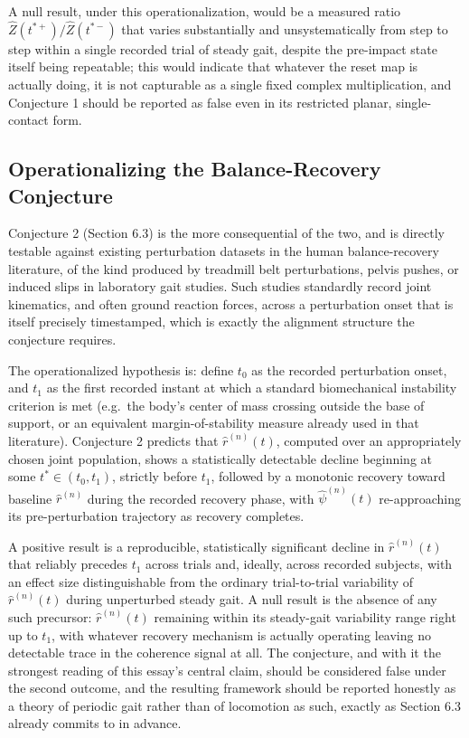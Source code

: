 \documentclass[12pt]{article}
\begin{document}
A null result, under this operationalization, would be a measured ratio $\hat Z(t^{*+})/\hat Z(t^{*-})$ that varies substantially and unsystematically from step to step within a single recorded trial of steady gait, despite the pre-impact state itself being repeatable; this would indicate that whatever the reset map is actually doing, it is not capturable as a single fixed complex multiplication, and Conjecture 1 should be reported as false even in its restricted planar, single-contact form.

\subsection{Operationalizing the Balance-Recovery Conjecture}

Conjecture 2 (Section 6.3) is the more consequential of the two, and is directly testable against existing perturbation datasets in the human balance-recovery literature, of the kind produced by treadmill belt perturbations, pelvis pushes, or induced slips in laboratory gait studies. Such studies standardly record joint kinematics, and often ground reaction forces, across a perturbation onset that is itself precisely timestamped, which is exactly the alignment structure the conjecture requires.

The operationalized hypothesis is: define $t_0$ as the recorded perturbation onset, and $t_1$ as the first recorded instant at which a standard biomechanical instability criterion is met (e.g.\ the body's center of mass crossing outside the base of support, or an equivalent margin-of-stability measure already used in that literature). Conjecture 2 predicts that $\hat r^{(n)}(t)$, computed over an appropriately chosen joint population, shows a statistically detectable decline beginning at some $t^* \in (t_0, t_1)$, strictly before $t_1$, followed by a monotonic recovery toward baseline $\hat r^{(n)}$ during the recorded recovery phase, with $\hat\psi^{(n)}(t)$ re-approaching its pre-perturbation trajectory as recovery completes.

A positive result is a reproducible, statistically significant decline in $\hat r^{(n)}(t)$ that reliably precedes $t_1$ across trials and, ideally, across recorded subjects, with an effect size distinguishable from the ordinary trial-to-trial variability of $\hat r^{(n)}(t)$ during unperturbed steady gait. A null result is the absence of any such precursor: $\hat r^{(n)}(t)$ remaining within its steady-gait variability range right up to $t_1$, with whatever recovery mechanism is actually operating leaving no detectable trace in the coherence signal at all. The conjecture, and with it the strongest reading of this essay's central claim, should be considered false under the second outcome, and the resulting framework should be reported honestly as a theory of periodic gait rather than of locomotion as such, exactly as Section 6.3 already commits to in advance.
\end{document}
